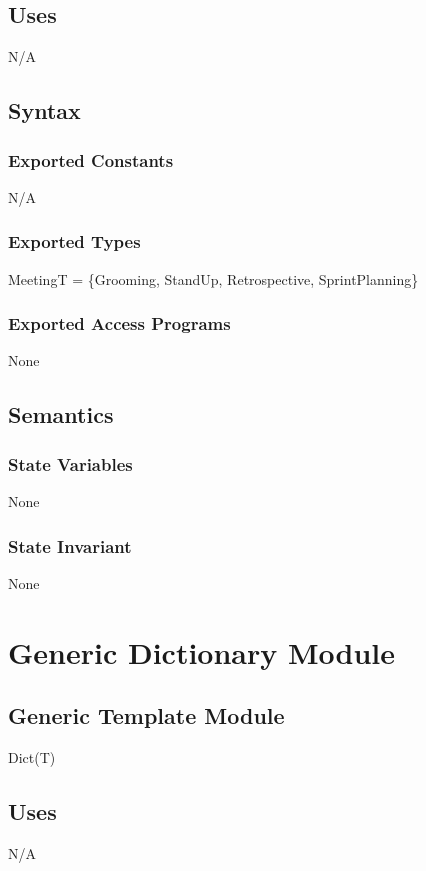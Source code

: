 \documentclass[12pt, titlepage]{article}
\begin{document}
\subsection*{Uses}
N/A

\subsection*{Syntax}
\subsubsection*{Exported Constants}
N/A

\subsubsection*{Exported Types}
MeetingT = \{Grooming, StandUp, Retrospective, SprintPlanning\}

\subsubsection*{Exported Access Programs}
None

\subsection*{Semantics}
\subsubsection* {State Variables}
None

\subsubsection* {State Invariant}
None

\newpage

\section*{Generic Dictionary Module}

\subsection*{Generic Template Module}
Dict(T)

\subsection*{Uses}
N/A
\end{document}

